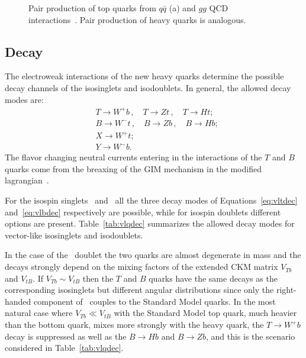 \begin{figure}[htb]\begin{center}
	\caption{Pair production of top quarks from $q\bar{q}$ (a) 
          and $gg$ QCD interactions~\cite{Kidonakis:2011ca}. Pair
          production of heavy quarks is analogous.\label{fig:ttprod}}
\end{center}\end{figure}


\subsection{Decay}\label{sec:vlqdecay}

The electroweak interactions of the new heavy
quarks determine the possible decay channels of
the isosinglets and isodoublets.
In general, the allowed decay modes are:
\begin{align}
& T \to W^+ b \,, \quad T \to Zt \,,\quad T \to Ht;\label{eq:vltdec}\\
& B \to W^- t \,, \quad B \to Zb \,,\quad B \to Hb;\label{eq:vlbdec}\\
& X \to W^+ t;\\
& Y \to W^- b.
\end{align}
The flavor changing neutral currents entering in the
interactions of the $T$ and $B$ quarks come from the
breaxing of the GIM mechanism in the modified 
lagrangian~\cite{AguilarSaavedra:2009es}.

For the isospin singlets \Tlr\ and \Blr\ all the 
three decay modes of Equations~\ref{eq:vltdec} and~\ref{eq:vlbdec}
respectively are possible, while for isospin doublets different
options are present. Table~\ref{tab:vlqdec} summarizes the
allowed  decay modes for vector-like isosinglets and isodoublets.

In the case of the \TBlr\ doublet the two quarks
are almost degenerate in mass and the decays strongly depend
on the mixing factors of the extended CKM matrix $V_{Tb}$ and
$V_{tB}$. If $V_{Tb}\sim V_{tB}$ then the $T$ and $B$ quarks
have the same decays as the corresponding isosinglets but
different angular distributions since only the right-handed
component of \TBlr\ couples to the Standard Model quarks.
In the most natural case where $V_{Tb} \ll V_{tB}$ with the
Standard Model top quark, much heavier than the bottom quark,
mixes more strongly with the heavy quark, the $T\to W^+ b$
decay is suppressed as well as the $B\to Hb$ and 
$B \to Zb$, and this is the scenario considered in 
Table~\ref{tab:vlqdec}.

